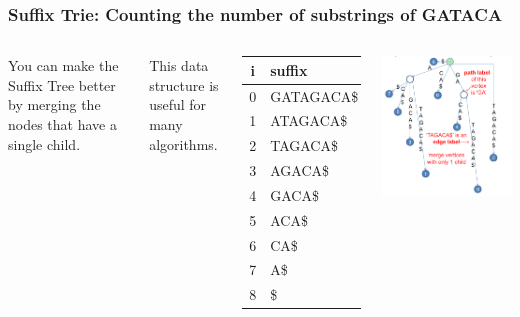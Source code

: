 \begin{frame}
  \frametitle{Suffix Trie: Counting the number of substrings of GATACA}
  \begin{columns}[T]

    {\smaller

    You can make the Suffix Tree better by merging the nodes that have a single child.\bigskip

    This data structure is useful for many algorithms.\bigskip

    \begin{tabular}{c|l}
      i & suffix\\
      \hline
      0 & GATAGACA\$\\
      1 & ATAGACA\$\\
      2 & TAGACA\$\\
      3 & AGACA\$\\
      4 & GACA\$\\
      5 & ACA\$\\
      6 & CA\$\\
      7 & A\$\\
      8 & \$\\
    \end{tabular}
    }

    \includegraphics[width=.8\textwidth]{../img/suffixtree_halim}
  \end{columns}
\end{frame}

